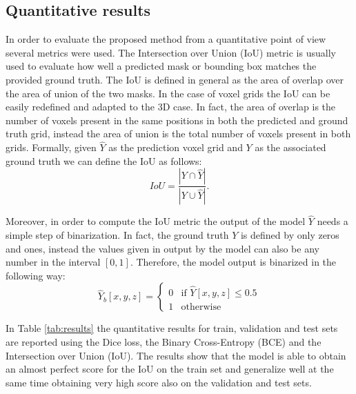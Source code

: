\documentclass[binding=0.6cm,noexaminfo]{sapthesis}
\begin{document}
\subsection{Quantitative results}

In order to evaluate the proposed method from a quantitative point of view several metrics were used. The Intersection over Union (IoU) metric is usually used to evaluate how well a predicted mask or bounding box matches the provided ground truth. The IoU is defined in general as the area of overlap over the area of union of the two masks. In the case of voxel grids the IoU can be easily redefined and adapted to the 3D case. In fact, the area of overlap is the number of voxels present in the same positions in both the predicted and ground truth grid, instead the area of union is the total number of voxels present in both grids. Formally, given $\hat{Y}$ as the prediction voxel grid and $Y$ as the associated ground truth we can define the IoU as follows:
\begin{equation}
IoU = \frac{|Y \cap \hat{Y}|}{|Y \cup \hat{Y}|}.
\end{equation}


Moreover, in order to compute the IoU metric the output of the model $\hat{Y}$ needs a simple step of binarization. In fact, the ground truth $Y$ is defined by only zeros and ones, instead the values given in output by the model can also be any number in the interval $[0, 1]$. Therefore, the model output is binarized in the following way:
\begin{equation}
\hat{Y}_b[x, y, z] = \begin{cases}
0 & \text{if } \hat{Y}[x, y, z] \le 0.5 \\
1 & \text{otherwise}
\end{cases}
\end{equation}

In Table \ref{tab:results} the quantitative results for train, validation and test sets are reported using the Dice loss, the Binary Cross-Entropy (BCE) and the Intersection over Union (IoU). The results show that the model is able to obtain an almost perfect score for the IoU on the train set and generalize well at the same time obtaining very high score also on the validation and test sets.
\end{document}
